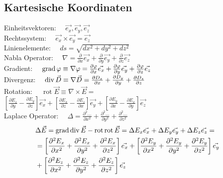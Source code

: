 \subsection{Kartesische Koordinaten}
Einheitsvektoren:   $\quad \vec{e_{x}}, \vec{e_{y}}, \vec{e_{z}}$\\ 
Rechtssystem:       $\quad \vec{e_{x}} \times \vec{e_{y}}=\vec{e_{z}}$\\
Linienelemente:     $\quad d s=\sqrt{d x^{2}+d y^{2}+d z^{2}}$\\
Nabla Operator:     $\quad \nabla=\frac{\partial}{\partial x} \vec{e_{x}}+\frac{\partial}{\partial y} \vec{e_{y}}+\frac{\partial}{\partial z} \vec{e_{z}}$\\
Gradient:           $\quad \operatorname{grad} \varphi \equiv \nabla \varphi=\frac{\partial \varphi}{\partial x} \vec{e_{x}}+\frac{\partial \varphi}{\partial y} \vec{e_{y}}+\frac{\partial \varphi}{\partial z} \vec{e_{z}}$\\
Divergenz:          $\quad \operatorname{div} \vec{D} \equiv \nabla \vec{D}=\frac{\partial D_{x}}{\partial x}+\frac{\partial D_{y}}{\partial y}+\frac{\partial D_{z}}{\partial z}$\\
Rotation:           $\quad \operatorname{rot} \vec{E} \equiv \nabla \times \vec{E} =$\\
                        $\left[\frac{\partial E_{z}}{\partial y}-\frac{\partial E_{y}}{\partial z}\right] \vec{e_{x}}+\left[\frac{\partial E_{x}}{\partial z}-\frac{\partial E_{z}}{\partial x}\right] \vec{e_{y}}+\left[\frac{\partial E_{y}}{\partial x}-\frac{\partial E_{x}}{\partial y}\right] \vec{e_{z}}$\\
Laplace Operator:   $\quad \Delta=\frac{\partial^{2} \ldots}{\partial x^{2}}+\frac{\partial^{2} \ldots}{\partial y^{2}}+\frac{\partial^{2} \ldots}{\partial z^{2}}$\\
\begin{align*}
    &\Delta \vec{E} = \operatorname{grad} \operatorname{div} \vec{E}-\operatorname{rot} \operatorname{rot} \vec{E} =\Delta E_{x} \vec{e_{x}}+\Delta E_{y} \vec{e_{y}}+\Delta E_{z} \vec{e_{z}}=\\
                   &= \left[\frac{\partial^{2} E_{x}}{\partial x^{2}}+\frac{\partial^{2} E_{x}}{\partial y^{2}}+\frac{\partial^{2} E_{x}}{\partial z^{2}}\right] \vec{e_{x}}+\left[\frac{\partial^{2} E_{y}}{\partial x^{2}}+\frac{\partial^{2} E_{y}}{\partial y^{2}}+\frac{\partial^{2} E_{y}}{\partial z^{2}}\right] \vec{e_{y}}\\
                   &+ \left[\frac{\partial^{2} E_{z}}{\partial x^{2}}+\frac{\partial^{2} E_{z}}{\partial y^{2}}+\frac{\partial^{2} E_{z}}{\partial z^{2}}\right] \vec{e_{z}}
\end{align*}


